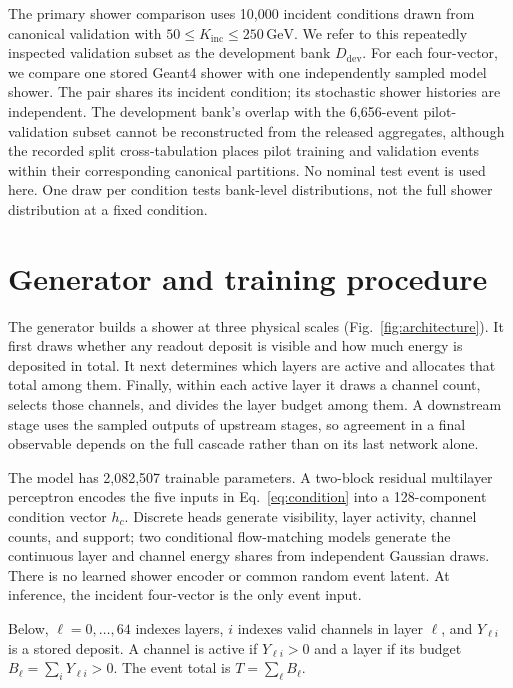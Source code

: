 \documentclass[11pt]{article}
\newcommand{\GeV}{\,\mathrm{GeV}}
\newcommand{\Kinc}{K_{\mathrm{inc}}}
\newcommand{\Ddev}{D_{\mathrm{dev}}}
\begin{document}
The primary shower comparison uses 10,000 incident conditions drawn from canonical validation with $50\leq\Kinc\leq250\GeV$. We refer to this repeatedly inspected validation subset as the development bank $\Ddev$. For each four-vector, we compare one stored Geant4 shower with one independently sampled model shower. The pair shares its incident condition; its stochastic shower histories are independent. The development bank's overlap with the 6,656-event pilot-validation subset cannot be reconstructed from the released aggregates, although the recorded split cross-tabulation places pilot training and validation events within their corresponding canonical partitions. No nominal test event is used here. One draw per condition tests bank-level distributions, not the full shower distribution at a fixed condition.

\section{Generator and training procedure}
\label{sec:model}

The generator builds a shower at three physical scales (Fig.~\ref{fig:architecture}). It first draws whether any readout deposit is visible and how much energy is deposited in total. It next determines which layers are active and allocates that total among them. Finally, within each active layer it draws a channel count, selects those channels, and divides the layer budget among them. A downstream stage uses the sampled outputs of upstream stages, so agreement in a final observable depends on the full cascade rather than on its last network alone.

The model has 2,082,507 trainable parameters. A two-block residual multilayer perceptron encodes the five inputs in Eq.~\eqref{eq:condition} into a 128-component condition vector $h_c$. Discrete heads generate visibility, layer activity, channel counts, and support; two conditional flow-matching models generate the continuous layer and channel energy shares from independent Gaussian draws. There is no learned shower encoder or common random event latent. At inference, the incident four-vector is the only event input.

Below, $\ell=0,\ldots,64$ indexes layers, $i$ indexes valid channels in layer $\ell$, and $Y_{\ell i}$ is a stored deposit. A channel is active if $Y_{\ell i}>0$ and a layer if its budget $B_\ell=\sum_iY_{\ell i}>0$. The event total is $T=\sum_\ell B_\ell$.
\end{document}
